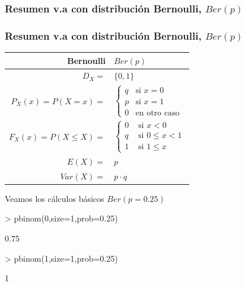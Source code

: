 \documentclass[handout]{beamer}
\renewcommand{\leq}{\leqslant}
\theoremstyle{plain}
\theoremstyle{definition}
\begin{document}
\subsubsection{Resumen v.a con distribución Bernoulli, $Ber(p)$}

\begin{frame}[fragile]
\frametitle{Resumen v.a con distribución Bernoulli, $Ber(p)$}
\begin{table}
\centering
\begin{tabular}{|rl|}
\hline 
\textbf{Bernoulli} & $Ber(p)$\\
\hline \hline 
$D_X=$ &  $\{0,1\}$ \\\hline 
$P_X(x)=P(X=x)=$ &  $\left\{\begin{array}{ll} q & \mbox{si } x=0\\
    p & \mbox{si } x=1\\
    0 & \mbox{en otro caso}\end{array}\right.$   \\ \hline 
$F_X(x)=P(X\leq X)=$ & $\left\{\begin{array}{ll} 0 & \mbox{ si } x<0\\
    q & \mbox{ si } 0\leq x<1\\
    1 & \mbox{ si } 1\leq x \end{array}\right.$ \\\hline 
$E(X)=$ &  $p$\\
$Var(X)=$ & $p\cdot q$\\
\hline
\end{tabular}
\end{table}
\end{frame}

\begin{frame}[fragile]

Veamos los cálculos básicos $Ber(p=0.25)$

\begin{Schunk}
\begin{Sinput}
> pbinom(0,size=1,prob=0.25)
\end{Sinput}
\begin{Soutput}
[1] 0.75
\end{Soutput}
\begin{Sinput}
> pbinom(1,size=1,prob=0.25)
\end{Sinput}
\begin{Soutput}
[1] 1
\end{Soutput}
\end{Schunk}

\end{frame}
\end{document}
